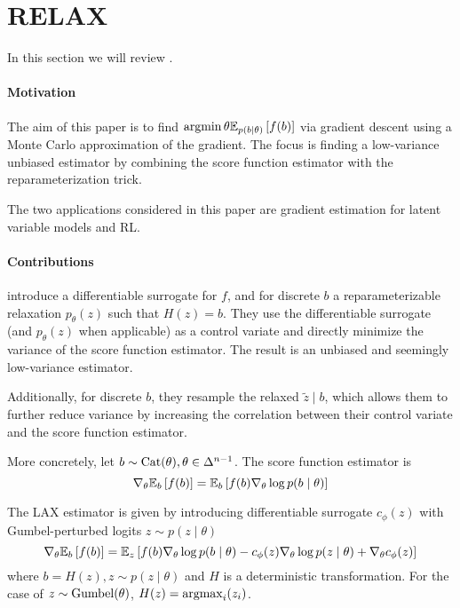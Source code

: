 \section{RELAX}
In this section we will review \citet{grathwohl2017relax}.

\paragraph{Motivation}
The aim of this paper is to find $\operatorname*{argmin}\theta \mathbb{E}_{p(b \mid \theta)}\left[f(b)\right]$
via gradient descent using a Monte Carlo approximation of the gradient.
The focus is finding a low-variance unbiased estimator by combining
the score function estimator with the reparameterization trick.

The two applications considered in this paper are gradient
estimation for latent variable models and RL.

\paragraph{Contributions}
\citet{grathwohl2017relax} introduce a differentiable surrogate for $f$, and for discrete $b$
a reparameterizable relaxation $p_\theta(z)$ such that $H(z) = b$.
They use the differentiable surrogate (and $p_\theta(z)$ when applicable) as a control
variate and directly minimize the variance of the score function estimator.
The result is an unbiased and seemingly low-variance estimator.

Additionally, for discrete $b$,
they resample the relaxed $\tilde{z} \mid b$,
which allows them to further reduce variance by increasing the correlation between
their control variate and the score function estimator.

More concretely, let $b \sim \mathrm{Cat}(\theta), \theta \in \Delta^{n-1}$.
The score function estimator is
\begin{equation}
\nabla_\theta \mathbb{E}_{b}\left[f(b)\right] = \mathbb{E}_{b}\left[f(b)\nabla_\theta \log p(b\mid\theta)\right]
\end{equation}

The LAX estimator is given by introducing differentiable surrogate $c_\phi(z)$
with Gumbel-perturbed logits $z \sim p(z \mid \theta)$
\begin{equation}
\nabla_\theta \mathbb{E}_{b}\left[f(b)\right] = \mathbb{E}_{z}\left[f(b)\nabla_\theta \log p(b\mid\theta)
- c_\phi(z)\nabla_\theta \log p(z \mid \theta) + \nabla_\theta c_\phi(z)\right]
\end{equation}
where $b = H(z), z\sim p(z\mid\theta)$ and $H$ is a deterministic transformation.
For the case of $z\sim\mathrm{Gumbel}(\theta)$, $H(z) = \operatorname*{argmax}_i(z_i)$.


